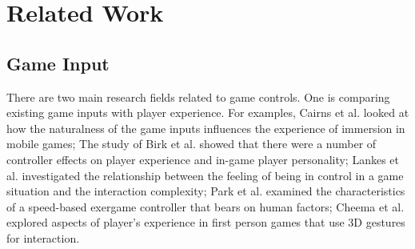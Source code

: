 \documentclass{sigchi}
\begin{document}







\section{Related Work}

    \subsection{Game Input}
    There are two main research fields related to game controls. One is comparing existing game inputs with player experience. For examples, Cairns et al.\cite{Cairns:2014:ICI:2556288.2557345} looked at how the naturalness of the game inputs influences the experience of immersion in mobile games; The study of Birk et al.\cite{Birk:2013:CYG:2470654.2470752} showed that there were a number of controller effects on player experience and in-game player personality; Lankes et al.\cite{Lankes:2012:CVC:2367616.2367629} investigated the relationship between the feeling of being in control in a game situation and the interaction complexity; Park et al.\cite{Park:2014:HFS:2556288.2557091} examined the characteristics of a speed-based exergame controller that bears on human factors; Cheema et al.\cite{Cheema:2011:WWT:2159365.2159407} explored aspects of player's experience in first person games that use 3D gestures for interaction.
\end{document}
